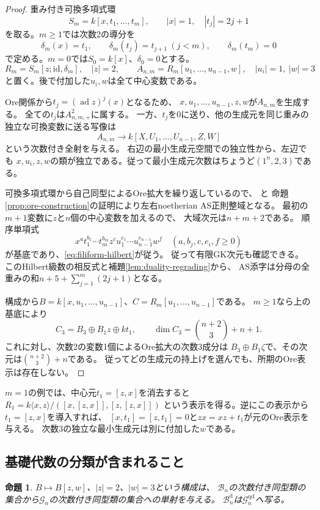 \documentclass[11pt,a4paper]{ltjsarticle}
\newtheorem{proposition}[theorem]{命題}
\theoremstyle{definition}
\newcommand{\Gclass}{\mathcal G}
\newcommand{\Bclass}{\mathcal B}
\begin{document}
\begin{proof}
重み付き可換多項式環
\[
S_m=k[x,t_1,\ldots,t_m],\qquad |x|=1,\quad |t_j|=2j+1
\]
を取る。$m\geq1$では次数2の導分を
\[
\delta_m(x)=t_1,\qquad
\delta_m(t_j)=t_{j+1}\ (j<m),\qquad
\delta_m(t_m)=0
\]
で定める。$m=0$では$S_0=k[x]$、$\delta_0=0$とする。
\[
R_m=S_m[z;\mathrm{id},\delta_m],\quad |z|=2,\qquad
A_{n,m}=R_m[u_1,\ldots,u_{n-1},w],
\quad |u_i|=1,\ |w|=3
\]
と置く。後で付加した$u_i,w$は全て中心変数である。

Ore関係から$t_j=(\operatorname{ad}z)^j(x)$となるため、
$x,u_1,\ldots,u_{n-1},z,w$が$A_{n,m}$を生成する。
全ての$t_j$は$A_{n,m,+}^2$に属する。
一方、$t_j$を0に送り、他の生成元を同じ重みの独立な可換変数に送る写像は
\[
A_{n,m}\longrightarrow k[X,U_1,\ldots,U_{n-1},Z,W]
\]
という次数付き全射を与える。
右辺の最小生成元空間での独立性から、左辺でも
$x,u_i,z,w$の類が独立である。従って最小生成元次数はちょうど$(1^n,2,3)$である。

可換多項式環から自己同型によるOre拡大を繰り返しているので、
\cite[\S1.2, \S1.3, Theorem 3.3]{LWW}と
命題\ref{prop:ore-construction}の証明により左右noetherian AS正則整域となる。
最初の$m+1$変数に$z$と$n$個の中心変数を加えるので、
大域次元は$n+m+2$である。
順序単項式
\[
x^a t_1^{b_1}\cdots t_m^{b_m}z^c
u_1^{e_1}\cdots u_{n-1}^{e_{n-1}}w^f
\quad(a,b_j,c,e_i,f\geq0)
\]
が基底であり、\eqref{eq:filiform-hilbert}が従う。
従って有限GK次元も確認できる。
このHilbert級数の相反式と補題\ref{lem:duality-regrading}から、
AS添字は分母の全重みの和$n+5+\sum_{j=1}^m(2j+1)$となる。

構成から$B=k[x,u_1,\ldots,u_{n-1}]$、$C=R_m[u_1,\ldots,u_{n-1}]$である。
$m\geq1$なら上の基底により
\[
C_3=B_3\oplus B_1z\oplus kt_1,\qquad
\dim C_3=\binom{n+2}{3}+n+1.
\]
これに対し、次数2の変数1個によるOre拡大の次数3成分は
$B_3\oplus B_1\zeta$で、その次元は$\binom{n+2}{3}+n$である。
従ってどの生成元の持上げを選んでも、所期のOre表示は存在しない。
\end{proof}

$m=1$の例では、中心元$t_1=[z,x]$を消去すると
$R_1=k\langle x,z\rangle/([x,[z,x]],[z,[z,x]])$
という表示を得る。逆にこの表示から$t_1=[z,x]$を導入すれば、
$[x,t_1]=[z,t_1]=0$と$zx=xz+t_1$が元のOre表示を与える。
次数3の独立な最小生成元は別に付加した$w$である。

\subsection{基礎代数の分類が含まれること}\label{subsec:base-embedding}
\begin{proposition}\label{prop:base-classification-embedding}
$B\mapsto B[z,w]$、$|z|=2$、$|w|=3$という構成は、
$\Bclass_n$の次数付き同型類の集合から$\Gclass_n$の次数付き同型類の集合への単射を与える。
$\Bclass_n^{\mathrm d}$は$\Gclass_n^{\mathrm{qd}}$へ写る。
\end{proposition}
\end{document}
